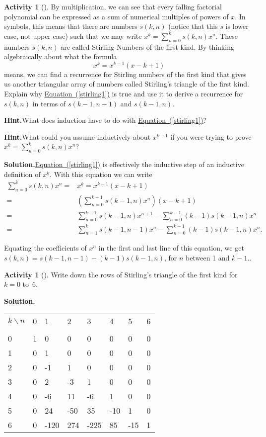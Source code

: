 \documentclass[10pt,]{book}
\theoremstyle{plain}
\theoremstyle{definition}
\newtheorem{activity}[project]{Activity}
\numberwithin{equation}{chapter}
\newcommand{\hrulethin}  {\noalign{\hrule height 0.04em}}
\newcommand{\amp}{&}
\begin{document}
\begin{activity}[]\label{Stirlingfirst}
By multiplication, we can see that every falling factorial polynomial can be expressed as a sum of numerical multiples of powers of \(x\). In symbols, this means that there are numbers \(s(k,n)\) (notice that this \(s\) is lower case, not upper case) such that we may write \(x^{\underline{k}} =
\sum_{n=0}^k s(k,n)x^n\). These numbers \(s(k,n)\) are called Stirling Numbers of the first kind. By thinking algebraically about what the formula%
\begin{equation}
x^{\underline{k}} =
x^{\underline{k-1}}(x-k+1)\label{stirling1}
\end{equation}
means, we can find a recurrence for Stirling numbers of the first kind that gives us another triangular array of numbers called Stirling's triangle of the first kind. Explain why \hyperref[stirling1]{Equation~(\ref{stirling1})} is true and use it to derive a recurrence for \(s(k,n)\) in terms of \(s(k-1,n-1)\) and \(s(k-1,n)\).%
\par\medskip\noindent%
\textbf{Hint.}\quad What does induction have to do with \hyperref[stirling1]{Equation~(\ref{stirling1})}?%
\par\medskip\noindent%
\textbf{Hint.}\quad What could you assume inductively about \(x^{\underline{k-1}}\) if you were trying to prove \(x^{\underline{k}} = \sum_{n=0}^k s(k,n)x^n\)?%
\par\medskip\noindent%
\textbf{Solution.}\quad \hyperref[stirling1]{Equation~(\ref{stirling1})} is effectively the inductive step of an inductive definition of \(x^{\underline{k}}\). With this equation we can write%
\begin{align*}
\sum_{n=0}^k s(k,n)x^n =\amp x^{\underline{k}} =
x^{\underline{k-1}}(x-k+1)\\
=\amp \left(\sum_{n=0}^{k-1}s(k-1,n)x^n\right)(x-k+1)\\
=\amp \sum_{n=0}^{k-1}s(k-1,n)x^{n+1} - \sum_{n=0}^{k-1}(k-1)s(k-1,n)x^n\\
=\amp \sum_{n=1}^k s(k-1,n-1)x^n-\sum_{n=0}^{k-1}(k-1)s(k-1,n)x^n.
\end{align*}
%
\par
Equating the coefficients of \(x^n\) in the first and last line of this equation, we get \(s(k,n) = s(k-1,n-1) -(k-1)s(k-1,n)\), for \(n\) between 1 and \(k-1\)..%
\end{activity}
\begin{activity}[]\label{activity-145}
Write down the rows of Stirling's triangle of the first kind for \(k=0\) to~6.%
\par\medskip\noindent%
\textbf{Solution.}\quad \begin{tabular}{llllllll}
\(k\backslash n\)&0&1&2&3&4&5&6\tabularnewline[0pt]
&&&&&&&\tabularnewline\hrulethin
0&1&0&0&0&0&0&0\tabularnewline[0pt]
1&0&1&0&0&0&0&0\tabularnewline[0pt]
2&0&-1&1&0&0&0&0\tabularnewline[0pt]
3&0&2&-3&1&0&0&0\tabularnewline[0pt]
4&0&-6&11&-6&1&0&0\tabularnewline[0pt]
5&0&24&-50&35&-10&1&0\tabularnewline[0pt]
6&0&-120&274&-225&85&-15&1
\end{tabular}
\end{activity}
\end{document}
